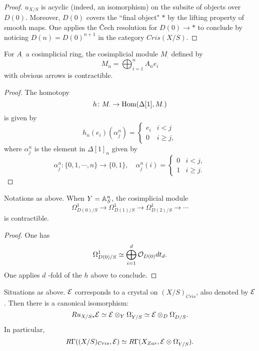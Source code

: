 \begin{proof}
    $u_{X/S}$ is acyclic (indeed, an isomorphism) 
    on the subsite of objects over $D(0)$. 
    Moreover, $D(0)$ covers the ``final object" $*$ 
    by the lifting property of smooth maps.
    One applies the \v Cech resolution for $D(0) \to *$ to conclude 
    by noticing $D(n) = D(0)^{n+1}$ in the category $Cris(X/S)$. 
\end{proof}

\begin{lemma}
    For $A_\cdot$ a cosimplicial ring, 
    the cosimplicial module $M_\cdot$ defined by
    \[
        M_n = \bigoplus_{i = 1}^n A_n e_i
    \]
    with obvious arrows is contractible.
\end{lemma}

\begin{proof}
    The homotopy
    \[
        h \colon M_\cdot \to \operatorname{Hom}(\Delta[1], M_\cdot)
    \]
    is given by 
    \[
        h_n (e_i) (\alpha_j^n) = \left\{
            \begin{array}{rr}
                e_i & i<j \\
                0   & i \geq j,
            \end{array}
        \right.
    \]
    where $\alpha_j^n$ is the element in $\Delta[1]_n$ given by 
    \[
        \alpha_j^n \colon \{0,1,\cdots,n\} \to \{0,1\}, 
        \quad \alpha_j^n(i) = \left\{
            \begin{array}{rr}
                0 & i<j, \\
                1 & i \geq j.
            \end{array}
        \right.
    \]
\end{proof}

\begin{lemma}
    \label{Poincare ii}
    Notations as above. 
    When $Y = {\mathbb {A}}^n_S$, the cosimplicial module 
    \[
        \Omega_{D(0)/S}^1 \to \Omega_{D(1)/S}^1 
        \to \Omega_{D(2)/S}^1 \to \cdots
    \]
    is contractible.
\end{lemma}

\begin{proof}
    One has
    \[
        \Omega_{D(0)/S}^1 \simeq 
        \bigoplus_{i=1}^d {\mathcal {O}}_{D(0)} dt_d.
    \]
    One applies $d$ -fold of the $h$ above to conclude.
\end{proof}

\begin{theorem}
    Situations as above. 
    ${\mathcal {E}}$ corresponds to a crystal on $(X/S)_{Cris}$, 
    also denoted by ${\mathcal {E}}$. 
    Then there is a canonical isomorphism:
    \[
        Ru_{X/S*} {\mathcal {E}} \simeq {\mathcal {E}} \otimes_Y \Omega_{Y/S}^\cdot 
        \simeq {\mathcal {E}} \otimes_D \Omega_{D/S}^\cdot.
    \]
    In particular,
    \[
        R \Gamma ((X/S)_{Cris},{\mathcal {E}}) \simeq 
        R \Gamma (X_{Zar}, {\mathcal {E}} \otimes \Omega_{Y/S}^\cdot). 
    \]
\end{theorem}

